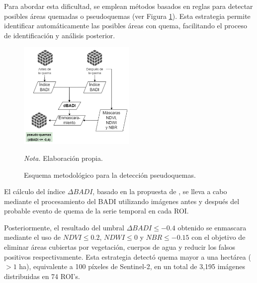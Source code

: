 Para abordar esta dificultad, se emplean métodos basados en reglas para detectar posibles áreas quemadas o pseudoquemas (ver Figura \ref{fig:dBADI}). Esta estrategia permite identificar automáticamente las posibles áreas con quema, facilitando el proceso de identificación y análisis posterior.

\begin{figure}[H]
    \centering
    \caption{Esquema metodológico para la detección pseudoquemas.}
    \includegraphics[width=0.5\textwidth]{img/6_metodologia/dBADI.png}
    \label{fig:dBADI}
    \begin{flushleft}
        \textit{Nota.} Elaboración propia.        
        \vspace{-\baselineskip}
    \end{flushleft}
\end{figure}


El cálculo del índice $\Delta BADI$, basado en la propuesta de \citet{farhadi_badi_2023}, se lleva a cabo mediante el procesamiento del BADI utilizando imágenes antes y después del probable evento de quema de la serie temporal en cada ROI. 

Posteriormente, el resultado del umbral $\Delta BADI \leq -0.4$ obtenido se enmascara mediante el uso de $NDVI \leq 0.2$, $NDWI \leq 0$ y $NBR \leq -0.15$ con el objetivo de eliminar áreas 
cubiertas por vegetación, cuerpos de agua y reducir los falsos positivos respectivamente. Esta estrategia detectó quema mayor a una hectárea ($> 1$ ha), equivalente a 100 píxeles de Sentinel-2, en un total de 3,195 imágenes distribuidas en 74 ROI's.

